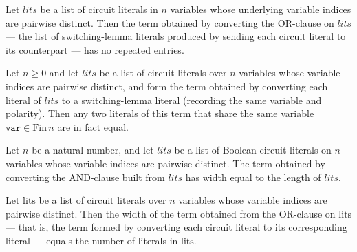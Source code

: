 \begin{theorem}
\label{BoolCircuit.NOrCircuit.clauseToTerm_nodup}
\leanok
{}
Let $lits$ be a list of circuit literals in $n$ variables whose underlying variable
indices are pairwise distinct. Then the term obtained by converting the OR-clause on
$lits$ — the list of switching-lemma literals produced by sending each circuit literal
to its counterpart — has no repeated entries.
\end{theorem}

\begin{theorem}
\label{BoolCircuit.NOrCircuit.clauseToTerm_var_inj}
\leanok
{}
Let $n \ge 0$ and let $lits$ be a list of circuit literals over $n$ variables whose
variable indices are pairwise distinct, and form the term obtained by converting each
literal of $lits$ to a switching-lemma literal (recording the same variable and
polarity). Then any two literals of this term that share the same variable $\mathtt{var}
\in \mathrm{Fin}\,n$ are in fact equal.
\end{theorem}

\begin{theorem}
\label{BoolCircuit.NAndCircuit.clauseToTerm_width}
\leanok
{}
Let $n$ be a natural number, and let $lits$ be a list of Boolean-circuit literals on $n$
variables whose variable indices are pairwise distinct. The term obtained by converting
the AND-clause built from $lits$ has width equal to the length of $lits$.
\end{theorem}

\begin{theorem}
\label{BoolCircuit.NOrCircuit.clauseToTerm_width}
\leanok
{}
Let $\mathrm{lits}$ be a list of circuit literals over $n$ variables whose variable
indices are pairwise distinct. Then the width of the term obtained from the OR-clause on
$\mathrm{lits}$ — that is, the term formed by converting each circuit literal to its
corresponding literal — equals the number of literals in $\mathrm{lits}$.
\end{theorem}

